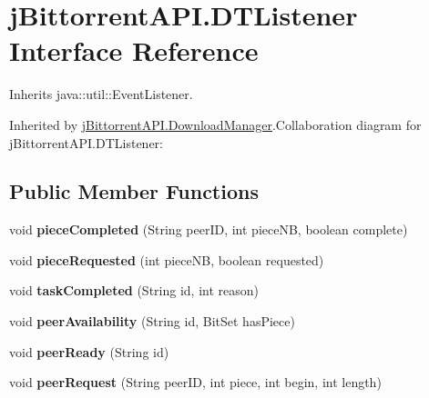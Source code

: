 \hypertarget{interfacej_bittorrent_a_p_i_1_1_d_t_listener}{
\section{jBittorrentAPI.DTListener Interface Reference}
\label{interfacej_bittorrent_a_p_i_1_1_d_t_listener}
}


Inherits java::util::EventListener.

Inherited by \hyperlink{classj_bittorrent_a_p_i_1_1_download_manager}{jBittorrentAPI.DownloadManager}.Collaboration diagram for jBittorrentAPI.DTListener:\subsection*{Public Member Functions}
\begin{DoxyCompactItemize}
\item 
\hypertarget{interfacej_bittorrent_a_p_i_1_1_d_t_listener_ad902126897025c72d584ffaaa815f693}{
void {\bfseries pieceCompleted} (String peerID, int pieceNB, boolean complete)}
\label{interfacej_bittorrent_a_p_i_1_1_d_t_listener_ad902126897025c72d584ffaaa815f693}

\item 
\hypertarget{interfacej_bittorrent_a_p_i_1_1_d_t_listener_a219096fedf93e6f1e6f89d12bfe3ac4b}{
void {\bfseries pieceRequested} (int pieceNB, boolean requested)}
\label{interfacej_bittorrent_a_p_i_1_1_d_t_listener_a219096fedf93e6f1e6f89d12bfe3ac4b}

\item 
\hypertarget{interfacej_bittorrent_a_p_i_1_1_d_t_listener_ae0baeb2413f9dcc52dac38b734c4af08}{
void {\bfseries taskCompleted} (String id, int reason)}
\label{interfacej_bittorrent_a_p_i_1_1_d_t_listener_ae0baeb2413f9dcc52dac38b734c4af08}

\item 
\hypertarget{interfacej_bittorrent_a_p_i_1_1_d_t_listener_a70e27740904d1868052fe7f1ceaaecdb}{
void {\bfseries peerAvailability} (String id, BitSet hasPiece)}
\label{interfacej_bittorrent_a_p_i_1_1_d_t_listener_a70e27740904d1868052fe7f1ceaaecdb}

\item 
\hypertarget{interfacej_bittorrent_a_p_i_1_1_d_t_listener_a5a757822f9adfca556a3509d750a9337}{
void {\bfseries peerReady} (String id)}
\label{interfacej_bittorrent_a_p_i_1_1_d_t_listener_a5a757822f9adfca556a3509d750a9337}

\item 
\hypertarget{interfacej_bittorrent_a_p_i_1_1_d_t_listener_a66a5d7bf0ac45819e29ebf4eee60b101}{
void {\bfseries peerRequest} (String peerID, int piece, int begin, int length)}
\label{interfacej_bittorrent_a_p_i_1_1_d_t_listener_a66a5d7bf0ac45819e29ebf4eee60b101}


\end{DoxyCompactItemize}
